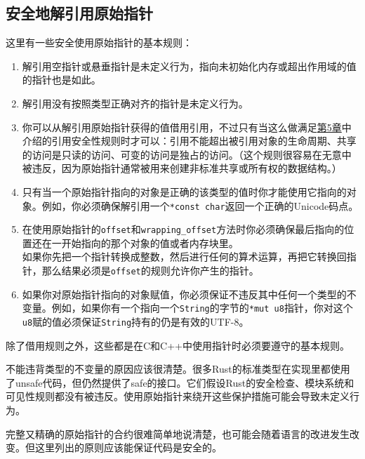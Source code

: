 \subsection{安全地解引用原始指针}\label{DerefRawP}
这里有一些安全使用原始指针的基本规则：
\begin{enumerate}
    \item 解引用空指针或悬垂指针是未定义行为，指向未初始化内存或超出作用域的值的指针也是如此。
    \item 解引用没有按照类型正确对齐的指针是未定义行为。
    \item 你可以从解引用原始指针获得的值借用引用，不过只有当这么做满足\hyperref[ch05]{第5章}中介绍的引用安全性规则时才可以：引用不能超出被引用对象的生命周期、共享的访问是只读的访问、可变的访问是独占的访问。（这个规则很容易在无意中被违反，因为原始指针通常被用来创建非标准共享或所有权的数据结构。）
    \item 只有当一个原始指针指向的对象是正确的该类型的值时你才能使用它指向的对象。例如，你必须确保解引用一个\texttt{*const char}返回一个正确的Unicode码点。
    \item 在使用原始指针的\texttt{offset}和\texttt{wrapping\_offset}方法时你必须确保最后指向的位置还在一开始指向的那个对象的值或者内存块里。\\ 如果你先把一个指针转换成整数，然后进行任何的算术运算，再把它转换回指针，那么结果必须是\texttt{offset}的规则允许你产生的指针。
    \item 如果你对原始指针指向的对象赋值，你必须保证不违反其中任何一个类型的不变量。例如，如果你有一个指向一个\texttt{String}的字节的\texttt{*mut u8}指针，你对这个\texttt{u8}赋的值必须保证\texttt{String}持有的仍是有效的UTF-8。
\end{enumerate}

除了借用规则之外，这些都是在C和C++中使用指针时必须要遵守的基本规则。

不能违背类型的不变量的原因应该很清楚。很多Rust的标准类型在实现里都使用了unsafe代码，但仍然提供了safe的接口。它们假设Rust的安全检查、模块系统和可见性规则都没有被违反。使用原始指针来绕开这些保护措施可能会导致未定义行为。

完整又精确的原始指针的合约很难简单地说清楚，也可能会随着语言的改进发生改变。但这里列出的原则应该能保证代码是安全的。

